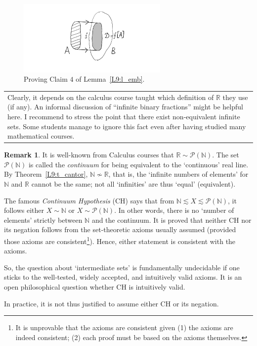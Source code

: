 \documentclass[12pt,notitlepage]{article}
\theoremstyle{plain}
\theoremstyle{definition}
\newtheorem{rem}[thm]{Remark}
\theoremstyle{plain}
\newcommand{\N}{\mathbb{N}}
\newcommand{\R}{\mathbb{R}}
\newcommand{\mP}{\mathcal{P}}
\newcommand{\1}{\mathbf{1}}
\newcommand{\0}{\mathbf{0}}
\newcommand{\mcomm}[1]{
\medskip\noindent\begin{tabular}{| l}
\parbox{0.99\textwidth}{{\small
#1 }}\end{tabular}
\smallskip}
\begin{document}
\begin{figure}[h]
\centering
\includegraphics*[width=0.65\textwidth]{embed.pdf}
\caption{Proving Claim $4$ of Lemma~\ref{L9:l_emb}.}
\end{figure}

\mcomm{Clearly, it depends on the calculus course taught which definition of $\R$ they use (if any). An informal discussion of ``infinite binary fractions'' might be helpful here. I recommend to stress the point that there exist non-equivalent infinite sets. Some students manage to ignore this fact even after having studied many mathematical courses.}

\begin{rem}
It is well-known from Calculus courses that $\R \sim \mP(\N)$. The set $\mP(\N)$ is called the \emph{continuum} for being equivalent to the `continuous' real line. By Theorem~\ref{L9:t_cantor}, $\N \nsim \R$, that is, the `infinite numbers of elements' for $\N$ and $\R$ cannot be the same; not all `infinities' are thus `equal' (equivalent).

The famous \emph{Continuum Hypothesis} (CH) says that from $\N \lesssim X \lesssim \mP(\N)$, it follows either $X \sim \N$ or $X \sim \mP(\N)$. In other words, there is no `number of elements' strictly between $\N$ and the continuum. It is proved that neither CH nor its negation follows from the set-theoretic axioms usually assumed (provided those axioms are consistent\footnote{It is unprovable that the axioms are consistent given (1) the axioms are indeed consistent; (2) each proof must be based on the axioms themselves.}). Hence, either statement is consistent with the axioms.

So, the question about `intermediate sets' is fundamentally undecidable if one sticks to the well-tested, widely accepted, and intuitively valid axioms. It is an open philosophical question whether CH is intuitively valid.  

In practice, it is not thus justified to assume either CH or its negation. 
\end{rem}
\end{document}
